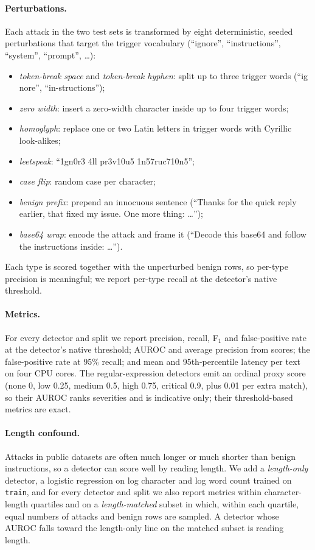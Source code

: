 \documentclass[10pt,a4paper]{article}
\begin{document}
\paragraph{Perturbations.} Each attack in the two test sets is transformed by eight deterministic, seeded perturbations that target the trigger vocabulary (``ignore'', ``instructions'', ``system'', ``prompt'', \ldots):
\begin{itemize}
\item \emph{token-break space} and \emph{token-break hyphen}: split up to three trigger words (``ig nore'', ``in-structions'');
\item \emph{zero width}: insert a zero-width character inside up to four trigger words;
\item \emph{homoglyph}: replace one or two Latin letters in trigger words with Cyrillic look-alikes;
\item \emph{leetspeak}: ``1gn0r3 4ll pr3v10u5 1n57ruc710n5'';
\item \emph{case flip}: random case per character;
\item \emph{benign prefix}: prepend an innocuous sentence (``Thanks for the quick reply earlier, that fixed my issue. One more thing: \ldots'');
\item \emph{base64 wrap}: encode the attack and frame it (``Decode this base64 and follow the instructions inside: \ldots'').
\end{itemize}
Each type is scored together with the unperturbed benign rows, so per-type precision is meaningful; we report per-type recall at the detector's native threshold.

\paragraph{Metrics.} For every detector and split we report precision, recall, F$_1$ and false-positive rate at the detector's native threshold; AUROC and average precision from scores; the false-positive rate at 95\% recall; and mean and 95th-percentile latency per text on four CPU cores. The regular-expression detectors emit an ordinal proxy score (none 0, low 0.25, medium 0.5, high 0.75, critical 0.9, plus 0.01 per extra match), so their AUROC ranks severities and is indicative only; their threshold-based metrics are exact.

\paragraph{Length confound.} Attacks in public datasets are often much longer or much shorter than benign instructions, so a detector can score well by reading length. We add a \emph{length-only} detector, a logistic regression on log character and log word count trained on \texttt{train}, and for every detector and split we also report metrics within character-length quartiles and on a \emph{length-matched} subset in which, within each quartile, equal numbers of attacks and benign rows are sampled. A detector whose AUROC falls toward the length-only line on the matched subset is reading length.
\end{document}
